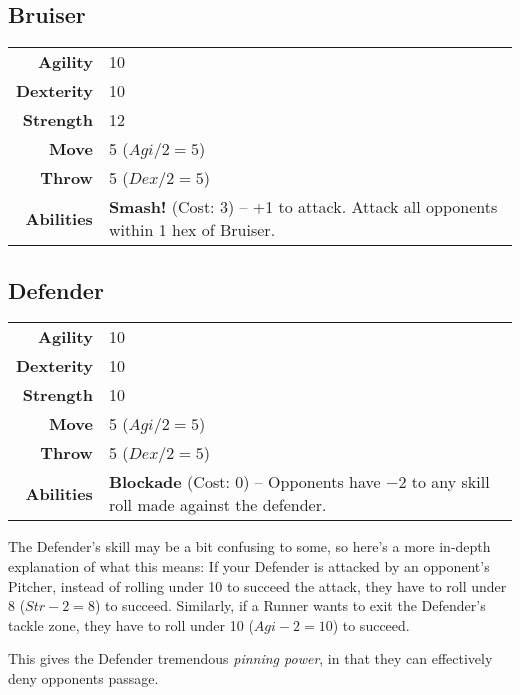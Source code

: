 \subsection{Bruiser}
\begin{center}
\begin{tabular}{r|p{5cm}}
    \textbf{Agility} & 10 \\
    \textbf{Dexterity} & 10 \\
    \textbf{Strength} & 12 \\ \hline
    \textbf{Move} & 5 ($Agi/2=5$)\\
    \textbf{Throw} & 5 ($Dex/2=5$) \\ \hline
    \textbf{Abilities} & \textbf{Smash!} (Cost: 3) -- +1 to attack.
    Attack all opponents within 1 hex of Bruiser.
\end{tabular}
\end{center}

\subsection{Defender}
\begin{center}
\begin{tabular}{r|p{5cm}}
    \textbf{Agility} & 10 \\
    \textbf{Dexterity} & 10 \\
    \textbf{Strength} & 10 \\ \hline
    \textbf{Move} & 5 ($Agi/2=5$)\\
    \textbf{Throw} & 5 ($Dex/2=5$) \\ \hline
    \textbf{Abilities} & \textbf{Blockade} (Cost: 0) -- Opponents have $-2$ to any skill roll made against the defender.
\end{tabular}
\end{center}

The Defender's skill may be a bit confusing to some, so here's a more in-depth explanation of what this means: If your Defender is attacked by an opponent's Pitcher, instead of rolling under 10 to succeed the attack, they have to roll under 8 ($Str-2=8$) to succeed.
Similarly, if a Runner wants to exit the Defender's tackle zone, they have to roll under 10 ($Agi-2=10$) to succeed.

This gives the Defender tremendous \textit{pinning power}, in that they can effectively deny opponents passage.